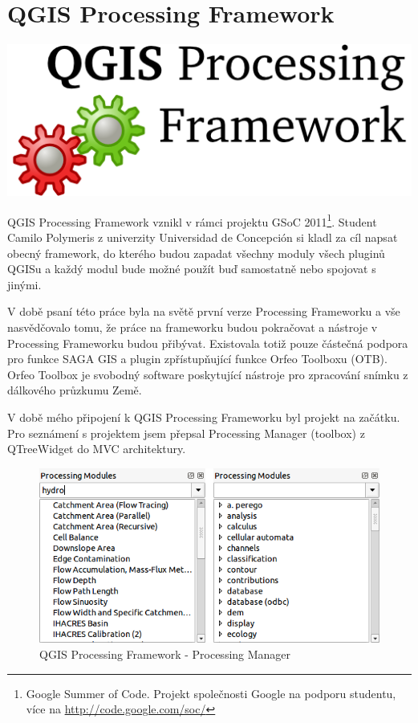 \newpage
{}
\section{QGIS Processing Framework}
\nocite{pf:www}


\begin{center}
		\includegraphics[scale=0.30]{pictures/qgis_pf}
\end{center}

QGIS Processing Framework vznikl v rámci projektu GSoC
2011\footnote{Google Summer of Code. Projekt společnosti Google
na podporu studentu, více na \url{http://code.google.com/soc/}}. Student
Camilo Polymeris z univerzity Universidad de Concepción si kladl za
cíl napsat obecný framework, do kterého budou zapadat všechny moduly
všech pluginů QGISu a každý modul bude možné použít buď samostatně
nebo spojovat s jinými.

V době psaní této práce byla na světě první verze Processing
Frameworku a vše nasvědčovalo tomu, že práce na frameworku budou
pokračovat a nástroje v Processing Frameworku budou
přibývat. Existovala totiž pouze částečná podpora pro funkce SAGA
GIS a plugin zpřístupňující funkce  Orfeo
Toolboxu (OTB). Orfeo Toolbox je svobodný software poskytující
nástroje pro zpracování snímku z 
dálkového průzkumu Země.

V době mého připojení k QGIS Processing Frameworku byl projekt na
začátku. Pro seznámení s projektem jsem přepsal Processing Manager
(toolbox) z QTreeWidget do MVC architektury.

\begin{figure}[h]
	\centering
	\includegraphics[scale=0.5]{pictures/pf/processing_manager_small}
	\caption{QGIS Processing Framework - Processing Manager}
  	\label{pf:pm}
\end{figure}

